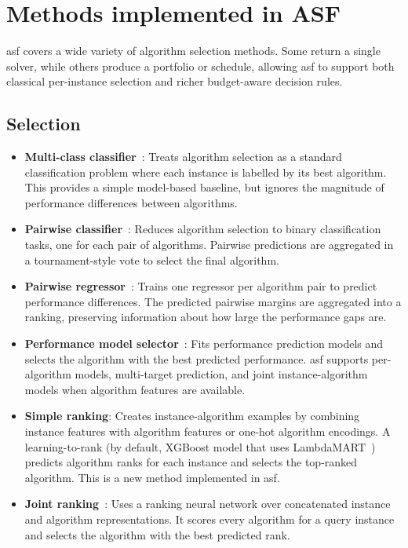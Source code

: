 \section{Methods implemented in ASF}
\label{sec:methods_implemented}

\Gls{asf} covers a wide variety of algorithm selection methods. Some return a single solver, while others produce a portfolio or schedule, allowing \gls{asf} to support both classical per-instance selection and richer budget-aware decision rules.

\subsection{Selection}
\begin{itemize}
    \item \textbf{Multi-class classifier}~\citep{Kotthoff13}: Treats algorithm selection as a standard classification problem where each instance is labelled by its best algorithm. This provides a simple model-based baseline, but ignores the magnitude of performance differences between algorithms.
    \item \textbf{Pairwise classifier}~\citep{XuEtAl12}: Reduces algorithm selection to binary classification tasks, one for each pair of algorithms. Pairwise predictions are aggregated in a tournament-style vote to select the final algorithm.
    \item \textbf{Pairwise regressor}~\citep{KerEtAl18}: Trains one regressor per algorithm pair to predict performance differences. The predicted pairwise margins are aggregated into a ranking, preserving information about how large the performance gaps are.
    \item \textbf{Performance model selector}~\citep{NudEtAl04,XuEtAl08}: Fits performance prediction models and selects the algorithm with the best predicted performance. \Gls{asf} supports per-algorithm models, multi-target prediction, and joint instance-algorithm models when algorithm features are available.
    \item \textbf{Simple ranking}: Creates instance-algorithm examples by combining instance features with algorithm features or one-hot algorithm encodings. A learning-to-rank (by default, XGBoost model that uses LambdaMART~\citep{Burges10}) predicts algorithm ranks for each instance and selects the top-ranked algorithm. This is a new method implemented in \gls{asf}.
    \item \textbf{Joint ranking}~\citep{OztEtAl22}: Uses a ranking neural network over concatenated instance and algorithm representations. It scores every algorithm for a query instance and selects the algorithm with the best predicted rank.

\end{itemize}
